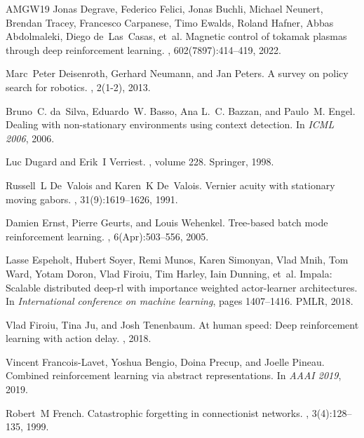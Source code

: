 \begin{thebibliography}{AMGW{\etalchar{+}}19}
Jonas Degrave, Federico Felici, Jonas Buchli, Michael Neunert, Brendan Tracey, Francesco Carpanese, Timo Ewalds, Roland Hafner, Abbas Abdolmaleki, Diego de~Las~Casas, et~al.
\newblock Magnetic control of tokamak plasmas through deep reinforcement learning.
, 602(7897):414--419, 2022.

Marc~Peter Deisenroth, Gerhard Neumann, and Jan Peters.
\newblock A survey on policy search for robotics.
, 2(1-2), 2013.

Bruno~C. da~Silva, Eduardo~W. Basso, Ana L.~C. Bazzan, and Paulo~M. Engel.
\newblock Dealing with non-stationary environments using context detection.
\newblock In {\em ICML 2006}, 2006.

Luc Dugard and Erik~I Verriest.
, volume 228.
\newblock Springer, 1998.

Russell~L De~Valois and Karen~K De~Valois.
\newblock Vernier acuity with stationary moving gabors.
, 31(9):1619--1626, 1991.

Damien Ernst, Pierre Geurts, and Louis Wehenkel.
\newblock Tree-based batch mode reinforcement learning.
, 6(Apr):503--556, 2005.

Lasse Espeholt, Hubert Soyer, Remi Munos, Karen Simonyan, Vlad Mnih, Tom Ward, Yotam Doron, Vlad Firoiu, Tim Harley, Iain Dunning, et~al.
\newblock Impala: Scalable distributed deep-rl with importance weighted actor-learner architectures.
\newblock In {\em International conference on machine learning}, pages 1407--1416. PMLR, 2018.

Vlad Firoiu, Tina Ju, and Josh Tenenbaum.
\newblock At human speed: Deep reinforcement learning with action delay.
, 2018.

Vincent Francois-Lavet, Yoshua Bengio, Doina Precup, and Joelle Pineau.
\newblock Combined reinforcement learning via abstract representations.
\newblock In {\em AAAI 2019}, 2019.

Robert~M French.
\newblock Catastrophic forgetting in connectionist networks.
, 3(4):128--135, 1999.


\end{thebibliography}
